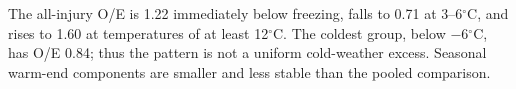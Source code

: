The all-injury O/E is 1.22 immediately below freezing, falls to 0.71 at 3--6$^{\circ}$C, and rises to 1.60 at temperatures of at least 12$^{\circ}$C. The coldest group, below $-6$$^{\circ}$C, has O/E 0.84; thus the pattern is not a uniform cold-weather excess. Seasonal warm-end components are smaller and less stable than the pooled comparison.
